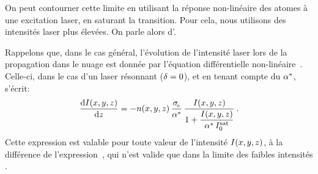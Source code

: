 On peut contourner cette limite en utilisant la réponse non-linéaire des atomes à une excitation laser, \cad en saturant la transition. Pour cela, nous utilisons des intensités laser plus élevées. On parle alors d'\emph{\ipadrfs}. 

Rappelons que, dans le cas général, l'évolution de l'intensité laser lors de la propagation dans le nuage est donnée par l'équation différentielle non-linéaire~. Celle-ci, dans le cas d'un laser résonnant (${\delta}=0$), et en tenant compte du \pdc ${{\alpha}^{*}}$, s'écrit:
\begin{equation}
	\Derive{\Ixyz}{z}
	= - \densxyz
	\, \frac{\seceff}{\Imperf} 
	\, \frac{\Ixyz}{1 + \dfrac{\Ixyz}{\Imperf\,\Isat}}
	\pointformule
	\label{eq:EqDiffAbsResonance}
\end{equation}
%
Cette expression est valable pour toute valeur de l'intensité ${{I}(x,y,z)}$, à la différence de l'expression~, qui n'est valide que dans la limite des faibles intensités .

